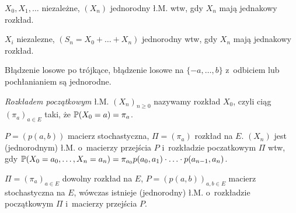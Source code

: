 	\begin{example}
		$X_0, X_1, \ldots$ niezależne, $(X_n)$ jednorodny ł.M.
		wtw, gdy $X_n$ mają jednakowy rozkład.
	\end{example}
	
	\begin{example}
		$X_i$ niezalezne, $(S_n = X_0 + \ldots + X_n)$ jednorodny 
		wtw, gdy $X_n$ mają jednakowy rozkład.
	\end{example}
	
	\begin{example}
		Błądzenie losowe po trójkące, błądzenie losowe na 
		$\{-a, \ldots, b\}$ z~odbiciem lub pochłanianiem
		są jednorodne.
	\end{example}
	
	\begin{definition}
		\emph{Rozkładem początkowym} ł.M. $(X_n)_{n \geq 0}$ nazywamy
		rozkład $X_0$, czyli ciąg $(\pi_a)_{a \in E}$
		taki, że $\P(X_0 = a) = \pi_a$.
	\end{definition}
	
	\begin{fact}
		$P = (p(a,b))$ macierz stochastyczna, $\Pi = (\pi_a)$ 
		rozkład na $E$.
		$(X_n)$ jest (jednorodnym) ł.M. o~macierzy przejścia $P$ 
		i~rozkładzie poczatkowym $\Pi$ wtw, gdy
		$\P(X_0 = a_0, \ldots, X_n = a_n)
			= \pi_{a_0} p(a_0, a_1) \cdot \ldots \cdot p(a_{n-1}, a_n)$.
	\end{fact}
	
	\begin{theorem}[o~istnieniu ł.M.]
		$\Pi = (\pi_a)_{a \in E}$ dowolny rozkład na $E$,
		$P = (p(a,b))_{a,b \in E}$ macierz stochastyczna na $E$,
		wówczas istnieje (jednorodny) ł.M. 
		o~rozkładzie początkowym $\Pi$
		i~macierzy przejścia $P$.
	\end{theorem}








 
 
